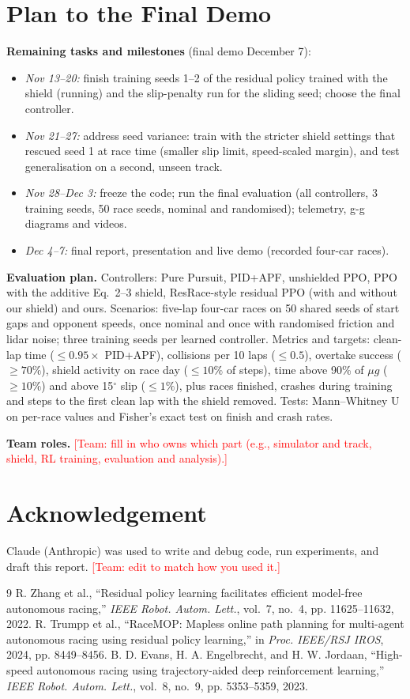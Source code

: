 \documentclass[conference]{IEEEtran}
\newcommand{\todo}[1]{\textcolor{red}{[#1]}}
\begin{document}
\section{Plan to the Final Demo}
\textbf{Remaining tasks and milestones} (final demo December 7):
\begin{itemize}
\item \emph{Nov 13--20:} finish training seeds 1--2 of the residual policy trained with the shield (running) and
the slip-penalty run for the sliding seed; choose the final controller.
\item \emph{Nov 21--27:} address seed variance: train with the stricter shield settings that rescued seed 1 at race
time (smaller slip limit, speed-scaled margin), and test generalisation on a second, unseen track.
\item \emph{Nov 28--Dec 3:} freeze the code; run the final evaluation (all controllers, 3 training seeds, 50 race
seeds, nominal and randomised); telemetry, g-g diagrams and videos.
\item \emph{Dec 4--7:} final report, presentation and live demo (recorded four-car races).
\end{itemize}
\textbf{Evaluation plan.} Controllers: Pure Pursuit, PID+APF, unshielded PPO, PPO with the additive Eq.~2--3
shield, ResRace-style residual PPO (with and without our shield) and ours. Scenarios: five-lap four-car races on
50 shared seeds of start gaps and opponent speeds, once nominal and once with randomised friction and lidar noise;
three training seeds per learned controller. Metrics and targets: clean-lap time ($\le 0.95\times$ PID+APF),
collisions per 10 laps ($\le 0.5$), overtake success ($\ge 70\%$), shield activity on race day ($\le 10\%$ of
steps), time above 90\% of $\mu g$ ($\ge 10\%$) and above 15$^\circ$ slip ($\le 1\%$), plus races finished,
crashes during training and steps to the first clean lap with the shield removed. Tests: Mann--Whitney U on
per-race values and Fisher's exact test on finish and crash rates.

\textbf{Team roles.} \todo{Team: fill in who owns which part (e.g., simulator and track, shield, RL training,
evaluation and analysis).}

\section*{Acknowledgement}
Claude (Anthropic) was used to write and debug code, run experiments, and draft this report. \todo{Team: edit to
match how you used it.}

\begin{thebibliography}{9}
 R. Zhang et al., ``Residual policy learning facilitates efficient model-free autonomous
racing,'' \emph{IEEE Robot. Autom. Lett.}, vol.~7, no.~4, pp. 11625--11632, 2022.
 R. Trumpp et al., ``RaceMOP: Mapless online path planning for multi-agent autonomous racing
using residual policy learning,'' in \emph{Proc. IEEE/RSJ IROS}, 2024, pp. 8449--8456.
 B. D. Evans, H. A. Engelbrecht, and H. W. Jordaan, ``High-speed autonomous racing using
trajectory-aided deep reinforcement learning,'' \emph{IEEE Robot. Autom. Lett.}, vol.~8, no.~9, pp. 5353--5359,
2023.
\end{thebibliography}
\end{document}
